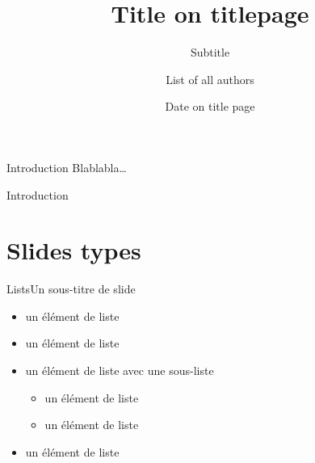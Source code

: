 \documentclass[10pt, aspectratio=169, french]{beamer}
\title[Title in footer]{Title on titlepage}
\subtitle[Subtitle in footer]{Subtitle}
\author[Authors in footer]{List of all authors}
\institute[Institute in footer]{Insitute on title page}
\date[Date in footer]{Date on title page}
\begin{document}

\begin{frame}[plain]
  \maketitle
\end{frame}

\begin{frame}{Introduction}
  Blablabla\ldots
\end{frame}

\begin{frame}{Introduction}
  \tableofcontents
\end{frame}



\section{Slides types}



\begin{frame}{Lists}{Un sous-titre de slide}

  \begin{itemize} \setlength{\itemsep}{0.67em}
  \item un élément de liste
  \item un élément de liste
  \item un élément de liste avec une sous-liste
    \begin{itemize} \setlength{\itemsep}{0.33em}
    \item un élément de liste
    \item un élément de liste
    \end{itemize}
  \item un élément de liste
  \end{itemize}

\end{frame}
\end{document}
